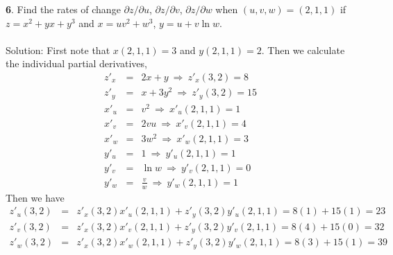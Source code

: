 \documentclass[12pt]{amsbook}
\begin{document}
\noindent
{\small\bf 6}. Find the rates of change $\partial z/\partial u$, $\partial z/\partial v$, $\partial z/\partial w$ when $(u, v, w) = (2, 1, 1)$
if $z=x^2+yx+y^3$ and $x = uv^2 + w^3$, $y = u + v\ln w$.
\\
\\
{\sc Solution}: First note that $x(2,1,1)=3$ and $y(2,1,1)=2$. Then we calculate the individual partial derivatives,
\begin{eqnarray*}
z'_x&=&2x+y \ \Rightarrow \ z'_x(3,2)=8 \\
z'_y&=&x+3y^2 \ \Rightarrow \ z'_y(3,2)=15 \\
x'_u&=& v^2 \ \Rightarrow \ x'_u(2,1,1)=1 \\
x'_v&=& 2vu \ \Rightarrow \ x'_v(2,1,1)=4 \\
x'_w&=& 3w^2 \ \Rightarrow \ x'_w(2,1,1)=3 \\
y'_u&=& 1 \ \Rightarrow \ y'_u(2,1,1)=1 \\
y'_v&=& \ln w \ \Rightarrow \ y'_v(2,1,1)=0 \\
y'_w&=& \frac{v}{w} \ \Rightarrow \ y'_w(2,1,1)=1 
\end{eqnarray*}
Then we have
\begin{eqnarray*}
z'_u(3,2)&=&z'_x(3,2)x'_u(2,1,1)+z'_y(3,2)y'_u(2,1,1)=8(1)+15(1)=23\\
z'_v(3,2)&=&z'_x(3,2)x'_v(2,1,1)+z'_y(3,2)y'_v(2,1,1)=8(4)+15(0)=32\\
z'_w(3,2)&=&z'_x(3,2)x'_w(2,1,1)+z'_y(3,2)y'_w(2,1,1)=8(3)+15(1)=39
\end{eqnarray*}
\end{document}
